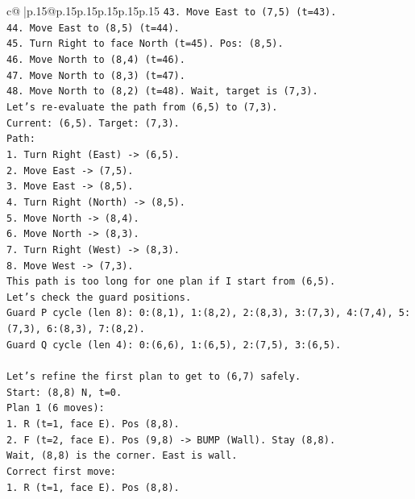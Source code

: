 \documentclass{article}
\begin{document}
{\begin{supertabular}{c@{$\;$}|p{.15\linewidth}@{}p{.15\linewidth}p{.15\linewidth}p{.15\linewidth}p{.15\linewidth}p{.15\linewidth}}
{{{\texttt{43. Move East to (7,5) (t=43).} \\
\texttt{44. Move East to (8,5) (t=44).} \\
\texttt{45. Turn Right to face North (t=45). Pos: (8,5).} \\
\texttt{46. Move North to (8,4) (t=46).} \\
\texttt{47. Move North to (8,3) (t=47).} \\
\texttt{48. Move North to (8,2) (t=48). Wait, target is (7,3).} \\
\texttt{Let's re{-}evaluate the path from (6,5) to (7,3).} \\
\texttt{Current: (6,5). Target: (7,3).} \\
\texttt{Path:} \\
\texttt{1. Turn Right (East) {-}> (6,5).} \\
\texttt{2. Move East {-}> (7,5).} \\
\texttt{3. Move East {-}> (8,5).} \\
\texttt{4. Turn Right (North) {-}> (8,5).} \\
\texttt{5. Move North {-}> (8,4).} \\
\texttt{6. Move North {-}> (8,3).} \\
\texttt{7. Turn Right (West) {-}> (8,3).} \\
\texttt{8. Move West {-}> (7,3).} \\
\texttt{This path is too long for one plan if I start from (6,5).} \\
\texttt{Let's check the guard positions.} \\
\texttt{Guard P cycle (len 8): 0:(8,1), 1:(8,2), 2:(8,3), 3:(7,3), 4:(7,4), 5:(7,3), 6:(8,3), 7:(8,2).} \\
\texttt{Guard Q cycle (len 4): 0:(6,6), 1:(6,5), 2:(7,5), 3:(6,5).} \\
\\ 
\texttt{Let's refine the first plan to get to (6,7) safely.} \\
\texttt{Start: (8,8) N, t=0.} \\
\texttt{Plan 1 (6 moves):} \\
\texttt{1. R (t=1, face E). Pos (8,8).} \\
\texttt{2. F (t=2, face E). Pos (9,8) {-}> BUMP (Wall). Stay (8,8).} \\
\texttt{Wait, (8,8) is the corner. East is wall.} \\
\texttt{Correct first move:} \\
\texttt{1. R (t=1, face E). Pos (8,8).} \\
}}}
\end{supertabular}}
\end{document}

